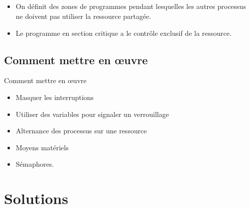 \subsection{\subsectitle}
\begin{frame}{\sectitle}
    \begin{alertblock}{\subsectitle}
        \begin{itemize}
            \item On définit des zones de programmes pendant lesquelles les
                autres processus ne doivent pas utiliser la ressource partagée.
            \item Le programme en section critique a le contrôle exclusif de la
                ressource.
        \end{itemize}
    \end{alertblock}

    \def\subsectitle{Comment mettre en {\oe}uvre}
    \subsection{\subsectitle}
    \begin{block}{\subsectitle}
        \begin{itemize}
            \item Masquer les interruptions
            \item Utiliser des variables pour signaler un verrouillage
            \item Alternance des processus sur une ressource
            \item Moyens matériels
            \item Sémaphores.
        \end{itemize}
    \end{block}

\end{frame}

\def\sectitle{Solutions}
\section{\sectitle}
\def\subsectitle{Masquage de interruptions}
